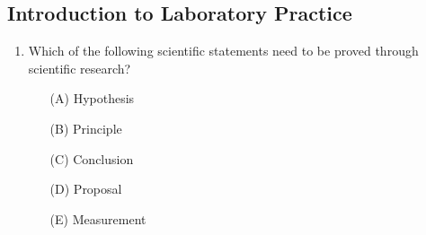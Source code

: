 \subsection{Introduction to Laboratory Practice}

\begin{enumerate}
	\item Which of the following scientific statements need to be proved through scientific research?
	\begin{enumerate}[topsep=0ex,itemsep=0ex,partopsep=1ex,parsep=1ex]
		\item[(A)] Hypothesis
		\item[(B)] Principle
		\item[(C)] Conclusion
		\item[(D)] Proposal
		\item[(E)] Measurement
	\end{enumerate}
\end{enumerate}










